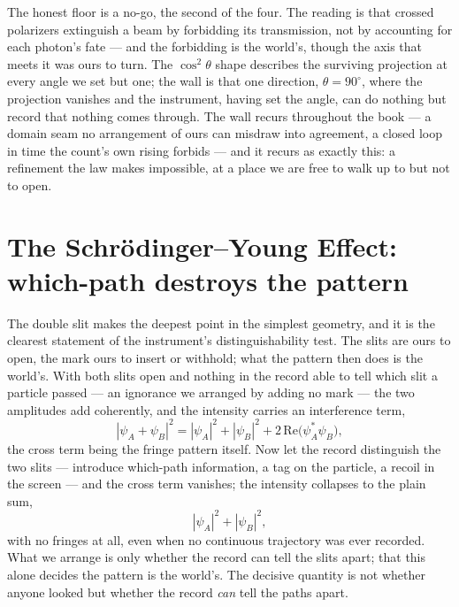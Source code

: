 The honest floor is a no-go, the second of the four. The reading is that crossed polarizers extinguish a beam
by forbidding its transmission, not by accounting for each photon's fate --- and the forbidding is the world's,
though the axis that meets it was ours to turn. The $\cos^2\theta$ shape describes the surviving projection at
every angle we set but one; the wall is that one direction, $\theta = 90^\circ$, where the projection vanishes
and the instrument, having set the angle, can do nothing but record that nothing comes through. The wall
recurs throughout the book --- a domain seam no arrangement of ours can misdraw into agreement, a closed loop
in time the count's own rising forbids --- and it recurs as exactly this: a refinement the law makes
impossible, at a place we are free to walk up to but not to open.

\section{The Schr\"odinger--Young Effect: which-path destroys the pattern}
\label{se:schrodinger-young}

The double slit makes the deepest point in the simplest geometry, and it is the clearest statement of the
instrument's distinguishability test. The slits are ours to open, the mark ours to insert or withhold; what
the pattern then does is the world's. With both slits open and nothing in the record able to tell which slit a
particle passed --- an ignorance we arranged by adding no mark --- the two amplitudes add coherently, and the
intensity carries an interference term,
\begin{equation}
  |\psi_A + \psi_B|^2 = |\psi_A|^2 + |\psi_B|^2 + 2\,\mathrm{Re}\bigl(\psi_A^{*}\psi_B\bigr),
\end{equation}
the cross term being the fringe pattern itself. Now let the record distinguish the two slits --- introduce
which-path information, a tag on the particle, a recoil in the screen --- and the cross term vanishes; the
intensity collapses to the plain sum,
\begin{equation}
  |\psi_A|^2 + |\psi_B|^2,
\end{equation}
with no fringes at all, even when no continuous trajectory was ever recorded. What we arrange is only whether
the record can tell the slits apart; that this alone decides the pattern is the world's. The decisive quantity
is not whether anyone looked but whether the record \emph{can} tell the paths apart.

